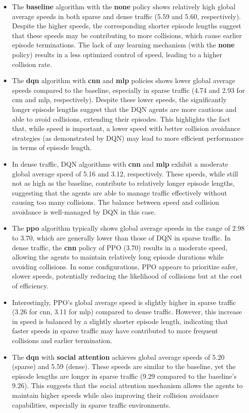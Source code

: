 \begin{itemize}
    \item The \textbf{baseline} algorithm with the \textbf{none} policy shows relatively high global average speeds in both sparse and dense traffic (5.59 and 5.60, respectively). Despite the higher speeds, the corresponding shorter episode lengths suggest that these speeds may be contributing to more collisions, which cause earlier episode terminations. The lack of any learning mechanism (with the \textbf{none} policy) results in a less optimized control of speed, leading to a higher collision rate.
    \item The \textbf{dqn} algorithm with \textbf{cnn} and \textbf{mlp} policies shows lower global average speeds compared to the baseline, especially in sparse traffic (4.74 and 2.93 for cnn and mlp, respectively). Despite these lower speeds, the significantly longer episode lengths suggest that the DQN agents are more cautious and able to avoid collisions, extending their episodes. This highlights the fact that, while speed is important, a lower speed with better collision avoidance strategies (as demonstrated by DQN) may lead to more efficient performance in terms of episode length.
    \item In dense traffic, DQN algorithms with \textbf{cnn} and \textbf{mlp} exhibit a moderate global average speed of 5.16 and 3.12, respectively. These speeds, while still not as high as the baseline, contribute to relatively longer episode lengths, suggesting that the agents are able to manage traffic effectively without causing too many collisions. The balance between speed and collision avoidance is well-managed by DQN in this case.
    \item The \textbf{ppo} algorithm typically shows global average speeds in the range of 2.98 to 3.70, which are generally lower than those of DQN in sparse traffic. In dense traffic, the \textbf{cnn} policy of PPO (3.70) results in a moderate speed, allowing the agents to maintain relatively long episode durations while avoiding collisions. In some configurations, PPO appears to prioritize safer, slower speeds, potentially reducing the likelihood of collisions but at the cost of efficiency.
    \item Interestingly, PPO's global average speed is slightly higher in sparse traffic (3.26 for cnn, 3.11 for mlp) compared to dense traffic. However, this increase in speed is balanced by a slightly shorter episode length, indicating that faster speeds in sparse traffic may have contributed to more frequent collisions and earlier termination.
    \item The \textbf{dqn} with \textbf{social attention} achieves global average speeds of 5.20 (sparse) and 5.59 (dense). These speeds are similar to the baseline, yet the episode lengths are longer in sparse traffic (9.29 compared to the baseline's 9.26). This suggests that the social attention mechanism allows the agents to maintain higher speeds while also improving their collision avoidance capabilities, especially in sparse traffic environments.
\end{itemize}

